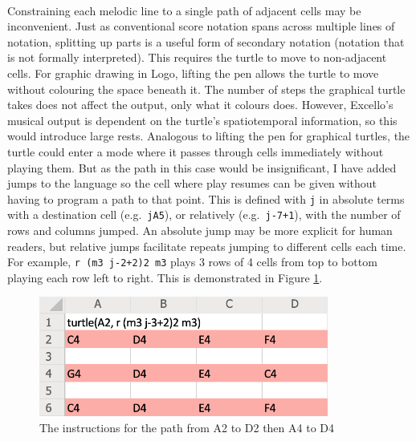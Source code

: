 \paragraph{} Constraining each melodic line to a single path of adjacent cells may be inconvenient. Just as conventional score notation spans across multiple lines of notation, splitting up parts is a useful form of secondary notation (notation that is not formally interpreted). This requires the turtle to move to non-adjacent cells. For graphic drawing in Logo, lifting the pen allows the turtle to move without colouring the space beneath it. The number of steps the graphical turtle takes does not affect the output, only what it colours does. However, Excello's musical output is dependent on the turtle's spatiotemporal information, so this would introduce large rests. Analogous to lifting the pen for graphical turtles, the turtle could enter a mode where it passes through cells immediately without playing them. But as the path in this case would be insignificant, I have added jumps to the language so the cell where play resumes can be given without having to program a path to that point. This is defined with \texttt{j} in absolute terms with a destination cell (e.g.~\texttt{jA5}), or relatively (e.g.~\texttt{j-7+1}), with the number of rows and columns jumped. An absolute jump may be more explicit for human readers, but relative jumps facilitate repeats jumping to different cells each time. For example, \texttt{r (m3 j-2+2)2 m3} plays 3 rows of 4 cells from top to bottom playing each row left to right. This is demonstrated in Figure \ref{prep:language2}.

\begin{figure}[ht]
  \centerline{\includegraphics[width=95mm]{figs/sheetDiss22.png}}
\caption{The instructions for the path from A2 to D2 then A4 to D4}
\label{prep:language2}
\end{figure}
\vspace{-20pt}


